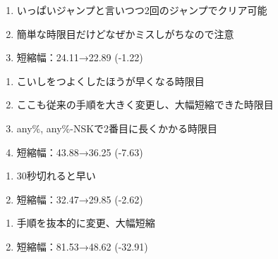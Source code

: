 \begin{enumerate}[label={\sarrow}]
\item いっぱいジャンプと言いつつ2回のジャンプでクリア可能
\item 簡単な時限目だけどなぜかミスしがちなので注意
\item 短縮幅：24.11→22.89 (-1.22)
\end{enumerate}



\clearpage
\begin{enumerate}[label={\sarrow}]
\item こいしをつよくしたほうが早くなる時限目
\item ここも従来の手順を大きく変更し、大幅短縮できた時限目
\item any\%, any\%-NSKで2番目に長くかかる時限目
\item 短縮幅：43.88→36.25 (-7.63)
\end{enumerate}



\begin{enumerate}[label={\sarrow}]
\item 30秒切れると早い
\item 短縮幅：32.47→29.85 (-2.62)
\end{enumerate}



\begin{enumerate}[label={\sarrow}]
\item 手順を抜本的に変更、大幅短縮
\item 短縮幅：81.53→48.62 (-32.91)
\end{enumerate}



